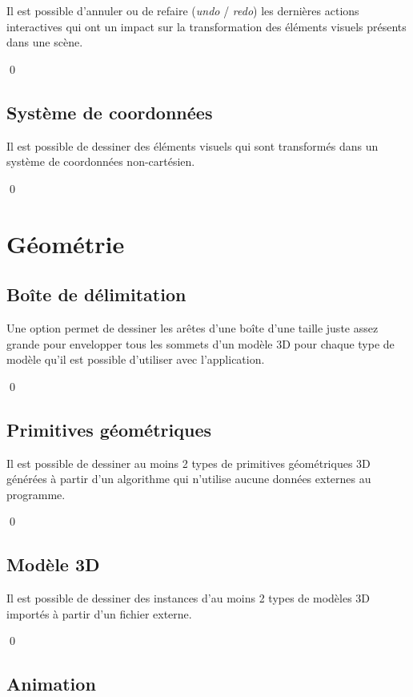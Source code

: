 \documentclass[12pt]{article}
\newcommand{\state}{\noindent}
\begin{document}
\state
Il est possible d'annuler ou de refaire (\textit{undo} / \textit{redo}) les dernières actions interactives qui ont un impact sur la transformation des éléments visuels présents dans une scène.


\qed

\subsection{Système de coordonnées}

\state
Il est possible de dessiner des éléments visuels qui sont transformés dans un système de coordonnées non-cartésien.

\qed


\pagebreak

\section{Géométrie}

\subsection{Boîte de délimitation}

\state
Une option permet de dessiner les arêtes d'une boîte d'une taille juste assez grande pour envelopper tous les sommets d'un modèle 3D pour chaque type de modèle qu'il est possible d'utiliser avec l'application.

\qed

\subsection{Primitives géométriques}

\state
Il est possible de dessiner au moins 2 types de primitives géométriques 3D générées à partir d'un algorithme qui n'utilise aucune données externes au programme.

\qed

\subsection{Modèle 3D}

\state
Il est possible de dessiner des instances d'au moins 2 types de modèles 3D importés à partir d'un fichier externe.

\qed

\subsection{Animation}
\end{document}

